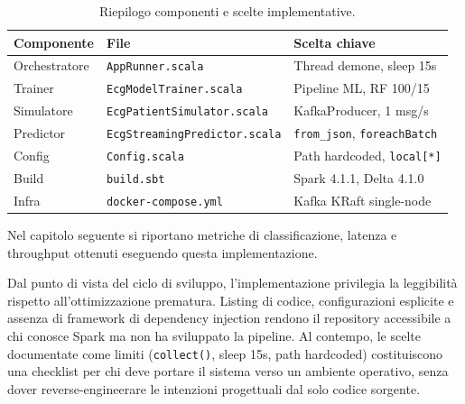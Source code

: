 \begin{table}[H]
  \centering
  \caption{Riepilogo componenti e scelte implementative.}
  \label{tab:componenti-implementazione}
  \footnotesize
  \begin{tabular}{@{}p{2.6cm}p{4.2cm}p{4.8cm}@{}}
    \toprule
    \textbf{Componente} & \textbf{File} & \textbf{Scelta chiave} \\
    \midrule
    Orchestratore & \texttt{AppRunner.scala} & Thread demone, sleep 15s \\
    Trainer & \texttt{EcgModelTrainer.scala} & Pipeline ML, RF 100/15 \\
    Simulatore & \texttt{EcgPatientSimulator.scala} & KafkaProducer, 1 msg/s \\
    Predictor & \texttt{EcgStreaming\-Predictor.scala} & \texttt{from\_json}, \texttt{foreachBatch} \\
    Config & \texttt{Config.scala} & Path hardcoded, \texttt{local[*]} \\
    Build & \texttt{build.sbt} & Spark 4.1.1, Delta 4.1.0 \\
    Infra & \texttt{docker-compose.yml} & Kafka KRaft single-node \\
    \bottomrule
  \end{tabular}
\end{table}

Nel capitolo seguente si riportano metriche di classificazione, latenza e throughput ottenuti eseguendo questa implementazione.

Dal punto di vista del ciclo di sviluppo, l'implementazione privilegia la leggibilità rispetto all'ottimizzazione prematura.
Listing di codice, configurazioni esplicite e assenza di framework di dependency injection rendono il repository accessibile a chi conosce Spark ma non ha sviluppato la pipeline.
Al contempo, le scelte documentate come limiti (\texttt{collect()}, sleep 15s, path hardcoded) costituiscono una checklist per chi deve portare il sistema verso un ambiente operativo, senza dover reverse-engineerare le intenzioni progettuali dal solo codice sorgente.
